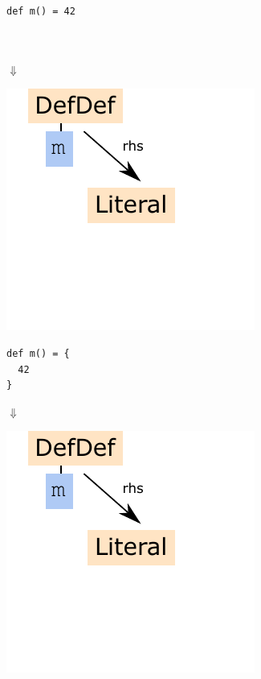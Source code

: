\documentclass[10pt,a4paper,oneside]{scrreprt}
\begin{document}
\begin{multicols}{3}

\begin{lstlisting}
def m() = 42



\end{lstlisting}
\begin{center}
  $\Downarrow$
\end{center}
\includegraphics[width=0.9\linewidth]{defdef_without_block.pdf}

\columnbreak

\begin{lstlisting}
def m() = { 
  42
}

\end{lstlisting}

\begin{center}
  $\Downarrow$
\end{center}
\includegraphics[width=0.9\linewidth]{defdef_without_block.pdf}


\end{multicols}
\end{document}
